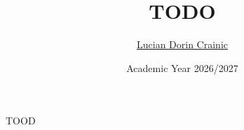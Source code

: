 \documentclass{beamer}
\title{TODO}
\author{\href{mailto:crainic1938430@studenti.uniroma1.it}{Lucian Dorin Crainic}}
\date{Academic Year 2026/2027}
\begin{document}
\maketitle

\begin{frame}
  TOOD
\end{frame}



\backmatter
\end{document}

